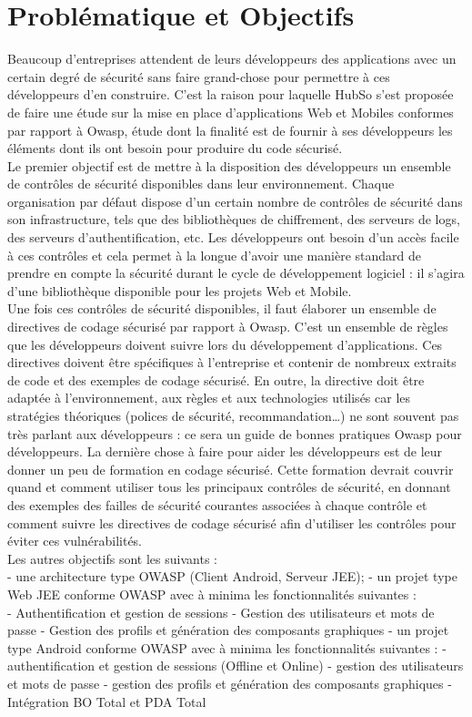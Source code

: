 \section{Problématique et Objectifs}
Beaucoup d’entreprises attendent de leurs développeurs des applications avec un certain degré de sécurité sans faire grand-chose pour permettre à ces développeurs d’en construire. C'est la raison pour laquelle HubSo s'est proposée de faire une étude sur la mise en place d'applications Web et Mobiles conformes par rapport à Owasp, étude dont la finalité est de fournir à ses développeurs les éléments dont ils ont besoin pour produire du code sécurisé. \\
Le premier objectif est de mettre à la disposition des développeurs un ensemble de contrôles de sécurité disponibles dans leur environnement. Chaque organisation par défaut dispose d’un certain nombre de contrôles de sécurité dans son infrastructure, tels que des bibliothèques de chiffrement, des serveurs de logs, des serveurs d'authentification, etc. Les développeurs ont besoin d'un accès facile à ces contrôles et cela permet à la longue d’avoir une manière standard de prendre en compte la sécurité durant le cycle de développement logiciel : il s'agira d'une bibliothèque disponible pour les projets Web et Mobile.\\
Une fois ces contrôles de sécurité disponibles, il faut élaborer un ensemble de directives de codage sécurisé par rapport à Owasp. C'est un ensemble de règles que les développeurs doivent suivre lors du développement d'applications. Ces directives doivent être spécifiques à l’entreprise et contenir de nombreux extraits de code et des exemples de codage sécurisé. En outre, la directive doit être adaptée à l’environnement, aux règles et aux technologies utilisés car les stratégies théoriques (polices de sécurité, recommandation…) ne sont souvent pas très parlant aux développeurs : ce sera un guide de bonnes pratiques Owasp pour développeurs.
La dernière chose à faire pour aider les développeurs est de leur donner un peu de formation en codage sécurisé. Cette formation devrait couvrir quand et comment utiliser tous les principaux contrôles de sécurité, en donnant des exemples des failles de sécurité courantes associées à chaque contrôle et comment suivre les directives de codage sécurisé afin d'utiliser les contrôles pour éviter ces vulnérabilités.\\
Les autres objectifs sont les suivants :\\
- une architecture type OWASP (Client Android, Serveur JEE);
- un projet type Web JEE conforme OWASP avec à minima les fonctionnalités suivantes : \\
	- Authentification et gestion de sessions
	- Gestion des utilisateurs et mots de passe
	- Gestion des profils et génération des composants graphiques
- un projet type Android conforme OWASP avec à minima les fonctionnalités suivantes :
	- authentification et gestion de sessions (Offline et Online)
	- gestion des utilisateurs et mots de passe
	- gestion des profils et génération des composants graphiques
- Intégration BO Total et PDA Total


